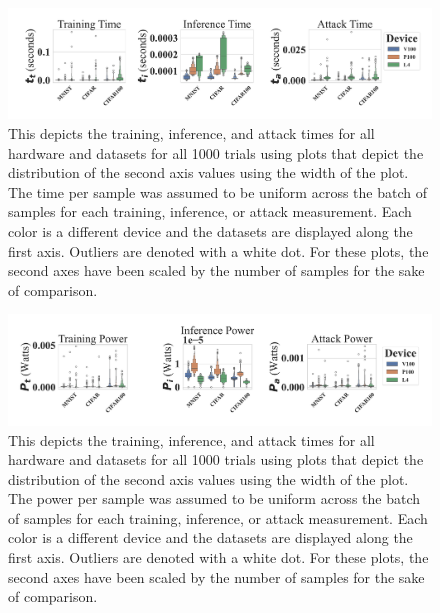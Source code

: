 \documentclass[sn-mathphys-num]{sn-jnl}%
\begin{document}
\begin{figure}[h]
    \centering
    \includegraphics[width=\textwidth]{plots/combined/time.pdf}
    \caption{This depicts the training, inference, and attack times for all hardware and datasets for all 1000 trials using plots that depict the distribution of the second axis values using the width of the plot. The time per sample was assumed to be uniform across the batch of samples for each training, inference, or attack measurement.
    Each color is a different device and the datasets are displayed along the first axis. Outliers are denoted with a white dot. For these plots, the second axes have been scaled by the number of samples for the sake of comparison.}
    \label{fig:time}
\end{figure}

\begin{figure}[h]
    \centering
    \includegraphics[width=\textwidth]{plots/combined/power.pdf}
    \caption{This depicts the training, inference, and attack times for all hardware and datasets for all 1000 trials using plots that depict the distribution of the second axis values using the width of the plot. The power per sample was assumed to be uniform across the batch of samples for each training, inference, or attack measurement.
    Each color is a different device and the datasets are displayed along the first axis. Outliers are denoted with a white dot. For these plots, the second axes have been scaled by the number of samples for the sake of comparison.}
    \label{fig:power}
\end{figure}
\end{document}
